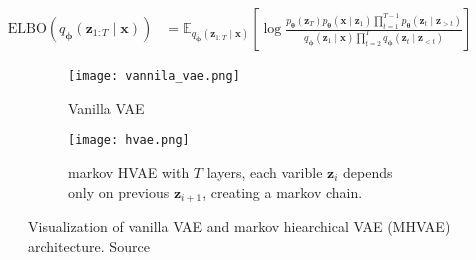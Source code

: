 \begin{align}
    \mathrm{ELBO}(q_{\boldsymbol{\phi}}(\boldsymbol{z}_{1:T}\mid\boldsymbol{x}))  &=
    \mathbb{E}_{q_{\boldsymbol{\phi}}(\boldsymbol{z}_{1:T}\mid\boldsymbol{x})}\left[\log \frac{p_{\boldsymbol{\theta}}(\boldsymbol{z}_T)p_{\boldsymbol{\theta}}(\boldsymbol{x}\mid\boldsymbol{z}_1)\prod_{t=1}^{T-1}p_{\boldsymbol{\theta}}(\boldsymbol{z}_{t}\mid\boldsymbol{z}_{>t})}{q_{\boldsymbol{\phi}}(\boldsymbol{z}_1\mid\boldsymbol{x})\prod_{t=2}^{T}q_{\boldsymbol{\phi}}(\boldsymbol{z}_{t}\mid\boldsymbol{z}_{<t})}\right]
\end{align}

\begin{figure}[]
    \centering
    \begin{subfigure}[b]{0.27\textwidth}
        \centering
        \texttt{[image: vannila\_vae.png]}
        \caption[]{Vanilla VAE}
        \label{fig:vanilla-vae}
    \end{subfigure}
    \hfill
    \begin{subfigure}[b]{0.63\textwidth}
        \centering
        \texttt{[image: hvae.png]}
        \caption[]{markov HVAE with $T$ layers, each varible $\boldsymbol{z}_i$ depends only on previous $\boldsymbol{z}_{i+1}$, creating a markov chain.}
        \label{fig:mhvae}
    \end{subfigure}
    \caption[VAE vs HVAE architecture]{Visualization of vanilla VAE and markov hiearchical VAE (MHVAE) architecture. Source \cite{diffusion-models-blog-2018}}
    \label{fig:vae-architecture}
\end{figure}


